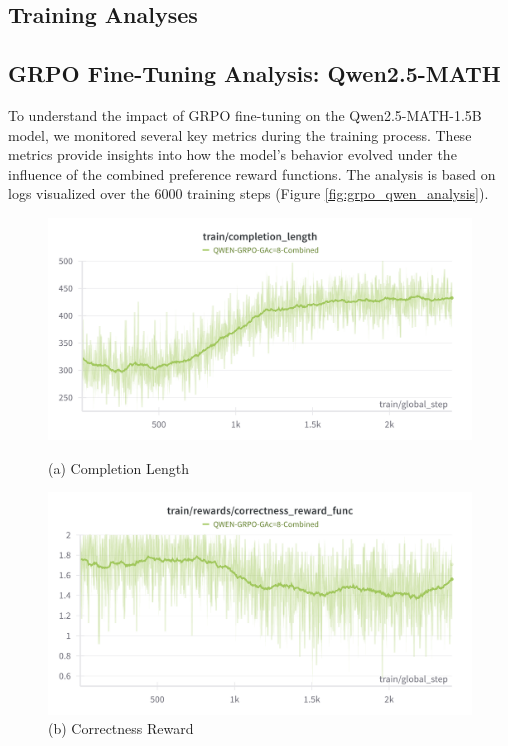 \documentclass[11pt]{article}
\begin{document}
\begin{itemize}
\section{Training Analyses}
\subsection{GRPO Fine-Tuning Analysis: Qwen2.5-MATH}

To understand the impact of GRPO fine-tuning on the Qwen2.5-MATH-1.5B model, we monitored several key metrics during the training process. These metrics provide insights into how the model's behavior evolved under the influence of the combined preference reward functions. The analysis is based on logs visualized over the 6000 training steps (Figure \ref{fig:grpo_qwen_analysis}).

\begin{figure}[htbp]
    \centering
    \begin{minipage}{0.48\textwidth}
        \centering
        \includegraphics[width=\linewidth]{Qwen/completion_length.png} %
        \caption*{(a) Completion Length} %
    \end{minipage}\hfill %
    \begin{minipage}{0.48\textwidth}
        \centering
        \includegraphics[width=\linewidth]{Qwen/corr_reward.png} %
        \caption*{(b) Correctness Reward}
    \end{minipage}


\end{figure}
\end{itemize}
\end{document}
